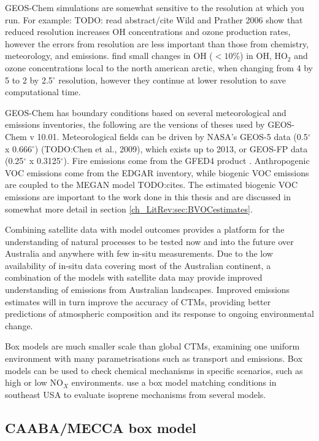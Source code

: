     GEOS-Chem simulations are somewhat sensitive to the resolution at which you run.
    For example: TODO: read abstract/cite Wild and Prather 2006 show that reduced resolution increases OH concentrations and ozone production  rates, however the errors from resolution are less important than those from chemistry, meteorology, and emissions. 
    \cite{Christian2017} find small changes in OH ($<10$\%) in OH, HO$_2$ and ozone concentrations local to the north american arctic, when changing from 4 by 5 to 2 by 2.5$^{\circ}$ resolution, however they continue at lower resolution to save computational time.
    
    GEOS-Chem has boundary conditions based on several meteorological and emissions inventories, the following are the versions of theses used by GEOS-Chem v 10.01. 
    Meteorological fields can be driven by NASA's GEOS-5 data (0.5$^{\circ}$ x 0.666$^{\circ}$) (TODO:Chen et al., 2009), which exists up to 2013, or GEOS-FP data (0.25$^{\circ}$ x 0.3125$^{\circ}$).
    Fire emissions come from the GFED4 product \citep{Giglio2013}. 
    Anthropogenic VOC emissions come from the EDGAR inventory, while biogenic VOC emissions are coupled to the MEGAN model TODO:cites.
    The estimated biogenic VOC emissions are important to the work done in this thesis and are discussed in somewhat more detail in section \ref{ch_LitRev:sec:BVOCestimates}.

    Combining satellite data with model outcomes provides a platform for the understanding of natural processes to be tested now and into the future over Australia and anywhere with few in-situ measurements.
    Due to the low availability of in-situ data covering most of the Australian continent, a combination of the models with satellite data may provide improved understanding of emissions from Australian landscapes.
    Improved emissions estimates will in turn improve the accuracy of CTMs, providing better predictions of atmospheric composition and its response to ongoing environmental change.
    
    Box models are much smaller scale than global CTMs, examining one uniform environment with many parametrisations such as transport and emissions.
    Box models can be used to check chemical mechanisms in specific scenarios, such as high or low NO$_X$ environments.
    \cite{Marvin2017} use a box model matching conditions in southeast USA to evaluate isoprene mechanisms from several models.
    
  
  \subsection{CAABA/MECCA box model}
    \label{ch_LitRev:sec:CAABAMECCAIntro}
